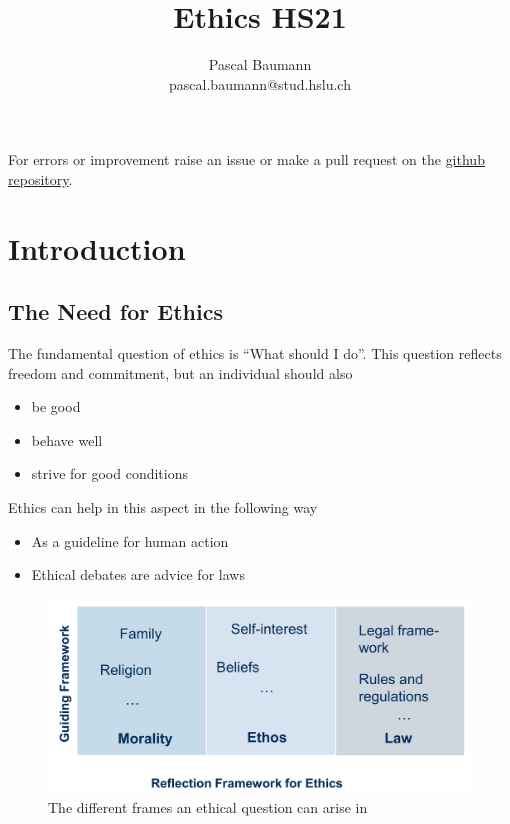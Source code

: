 \documentclass[11pt]{article}
\theoremstyle{definition}
\begin{document}
	
\title{Ethics HS21}
\author{Pascal Baumann\\pascal.baumann@stud.hslu.ch}
\maketitle

For errors or improvement raise an issue or make a pull request on the \href{https://github.com/KilnOfTheSecondFlame/mse_summaries}{github repository}.

\tableofcontents
\newpage

\section{Introduction}

\subsection{The Need for Ethics}
The fundamental question of ethics is \textquotedblleft What should I do\textquotedblright. This question reflects freedom and commitment, but an individual should also
\begin{itemize}[label=-, nosep]
	\item be good
	\item behave well
	\item strive for good conditions
\end{itemize}

\noindent
Ethics can help in this aspect in the following way
\begin{itemize}[nosep]
	\item As a guideline for human action
	\item Ethical debates are advice for laws
\end{itemize}

\begin{figure}[tbh]
	\centering
	\includegraphics[width=0.8\linewidth]{img/ethics_frame}
	\caption{The different frames an ethical question can arise in}
	\label{fig:ethicsframe}
\end{figure}
\end{document}
